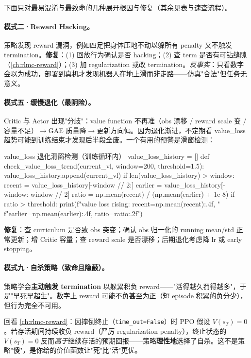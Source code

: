 下面只对最易混淆与最致命的几种展开根因与修复（其余见表与速查流程）。

\paragraph{模式二·Reward Hacking。}策略发现 reward 漏洞，例如四足把身体压地不动以躲所有 penalty 又不触发 termination。\textbf{修复}：(1) 回放行为确认是否 hacking；(2) 查 term 是否有可钻缝隙（\cref{ch:rlmc-reward}）；(3) 加 regularization 或改 termination。\emph{反事实}：只看数字会以为成功，部署到真机才发现机器人在地上滑而非走路——仿真"合法"但任务无意义。

\paragraph{模式五·缓慢退化（最阴险）。}Critic 与 Actor 出现"分歧"：value function 不再准（obs 漂移 / reward scale 变 / 容量不足）$\to$GAE 质量降$\to$更新方向偏。因为退化渐进，不定期看 value\_loss 趋势可能到训练结束才发现后半段全废。一个有用的预警是滑窗检测：

\begin{codebox}[Python]{value\_loss 退化滑窗检测（训练循环内）}
value_loss_history = []
def check_value_loss_trend(current_vl, window=200, threshold=1.5):
    value_loss_history.append(current_vl)
    if len(value_loss_history) > window:
        recent  = value_loss_history[-window // 2:]
        earlier = value_loss_history[-window:-window // 2]
        ratio = np.mean(recent) / (np.mean(earlier) + 1e-8)
        if ratio > threshold:
            print(f"value loss rising: recent={np.mean(recent):.4f}, "
                  f"earlier={np.mean(earlier):.4f}, ratio={ratio:.2f}")
\end{codebox}

\textbf{修复}：查 curriculum 是否致 obs 突变；确认 obs 归一化的 running mean/std 正常更新；增 Critic 容量；查 reward scale 是否漂移；后期退化考虑降 lr 或 early stopping。

\paragraph{模式九·自杀策略（致命且隐蔽）。}策略学会\textbf{主动触发 termination} 以躲累积负 reward——"活得越久罚得越多"，于是"早死早超生"。数字上 reward 可能不负甚至为正（短 episode 积累的负分少），但行为完全不可用。

\begin{insight}\label{ins:rlmc-diag-suicide}
回看 \cref{ch:rlmc-reward}：因摔倒终止（\verb|time_out=False|）时 PPO 假设 $V(s_T)=0$。若存活期间持续收负 reward（严厉 regularization penalty），终止状态的 $V(s_T)=0$ 反而\emph{高于}继续存活的预期回报——策略\textbf{理性地}选择了自杀。这不是策略"傻"，是你给的价值函数让"死"比"活"更优。
\end{insight}


